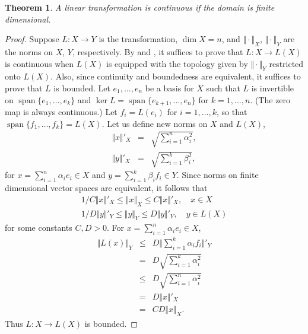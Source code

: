 \documentclass[12pt]{article}
\newtheorem{thm}{Theorem}
\begin{document}
\begin{thm}
A linear transformation is continuous if the domain is finite dimensional.
\end{thm}

\begin{proof}
Suppose $L\colon X\to Y$ is the transformation, $\dim X = n$,
  and  $\Vert \cdot \Vert_X$, $\Vert \cdot \Vert_Y$ are the norms
  on $X$, $Y$, respectively.
By 
and ,
it suffices to prove that $L\colon X\to L(X)$ is continuous
when $L(X)$ is equipped with the topology given by $\Vert \cdot \Vert_Y$
restricted onto $L(X)$. 
Also, since continuity and boundedness are equivalent, it suffices to
  prove that $L$ is bounded. 
Let $e_1,\ldots, e_n$ be a basis for $X$ such that 
$L$ is invertible on $\operatorname{span} \{e_{1}, \ldots, e_k\}$ and
$\operatorname{ker} L = \operatorname{span} \{e_{k+1}, \ldots, e_n\}$ for 
$k=1,\ldots, n$. (The zero map is always continuous.)
Let $f_i=L(e_i)$ for $i=1,\ldots, k$, so that 
$\operatorname{span}\{f_1, \ldots, f_k\}=L(X)$. 
Let us define new norms on $X$ and $L(X)$,
\begin{eqnarray*}
  \Vert x \Vert'_X &=& \sqrt{\sum_{i=1}^n \alpha_i^2},\\
  \Vert y \Vert'_X &=& \sqrt{\sum_{i=1}^k \beta_i^2},
\end{eqnarray*}
for $x=\sum_{i=1}^n \alpha_i e_i\in X$ and 
    $y=\sum_{i=1}^k \beta_i f_i \in Y$.
Since norms on finite dimensional vector spaces are equivalent, it follows
that 
\begin{eqnarray*}
    1/C \Vert x \Vert'_X \le \Vert x \Vert_X \le C \Vert x \Vert'_X, \quad x\in X \\
    1/D \Vert y \Vert'_Y \le \Vert y \Vert_Y \le D \Vert y \Vert'_Y, \quad y\in L(X)
\end{eqnarray*}
for some constants $C,D>0$.
For $x=\sum_{i=1}^n \alpha_i e_i\in X$,
\begin{eqnarray*}
\Vert L(x)\Vert_Y &\le & D \Vert \sum_{i=1}^k \alpha_i f_i \Vert'_Y \\
   &=& D \sqrt{\sum_{i=1}^k \alpha_i^2} \\
   &\le& D \sqrt{\sum_{i=1}^n \alpha_i^2} \\
   &=& D \Vert x \Vert'_X \\
   &=& CD \Vert x \Vert_X.
\end{eqnarray*}
Thus $L\colon X\to L(X)$ is bounded.
\end{proof}
\end{document}

